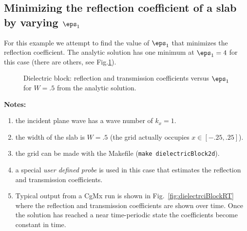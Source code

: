 \documentclass[11pt]{article}
\begin{document}
\subsection{Minimizing the reflection coefficient of a slab by varying $\eps_1$}

For this example we attempt to find the value of $\eps_1$ that  minimizes the reflection coefficient.
The analytic solution has one minimum at $\eps_1=4$ for this case (there are others, see Fig.\ref{fig:dielectricBlockCoeffVerusEps}). 

{%
%
\newcommand{\figWidth}{7.8cm}%
\newcommand{\trimfig}[2]{\trimw{#1}{#2}{.0}{.0}{.0}{.0}}
\begin{figure}[htb]
\begin{center}
\end{center}
\caption{Dielectric block: reflection and transmission coefficients versus $\eps_1$ for $W=.5$ from
     the analytic solution.}
  \label{fig:dielectricBlockCoeffVerusEps}
\end{figure}
}


\noindent\textbf{Notes:}
\begin{enumerate}
  \item the incident plane wave has a wave number of $k_x=1$.
  \item the width of the slab is $W=.5$ (the grid actually occupies $x\in[-.25,.25]$). 
  \item the grid can be made with the Makefile ({\tt make dielectricBlock2d}). 
  \item a special {\em user defined probe} is used in this case that estimates the reflection and transmission coefficients. 
  \item  Typical output from a CgMx run is shown in Fig.~\ref{fig:dielectrciBlockRT} where the reflection and transmission
    coefficients are shown over time. Once the solution has reached a near time-periodic state the coefficients become
      constant in time. 
\end{enumerate}
\end{document}
